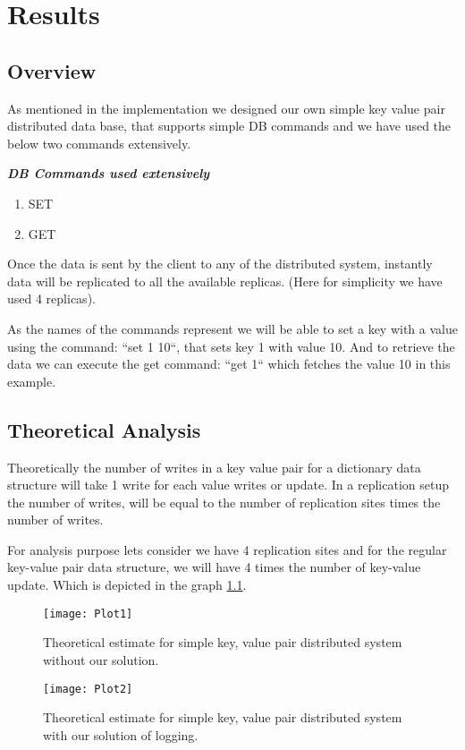 \chapter{Results}

\section{Overview}
As mentioned in the implementation we designed our own simple key value pair distributed data base, that supports simple DB commands and we have used the below two commands extensively. 

\textbf{\textit{DB Commands used extensively}}
\begin{enumerate}
\item SET 
\item GET
\end{enumerate}

 Once the data is sent by the client to any of the distributed system, instantly data will be replicated to all the available replicas. (Here for simplicity we have used 4 replicas). 

As the names of the commands represent we will be able to set a key with a value using the command: ``set 1 10``, that sets key 1 with value 10. And to retrieve the data we can execute the get command: ``get 1`` which fetches the value 10 in this example.

\section{Theoretical Analysis}
Theoretically the number of writes in a key value pair for a dictionary data structure will take 1 write for each value writes or update. In a replication setup the number of writes, will be equal to the number of replication sites times the number of writes. 

For analysis purpose lets consider we have 4 replication sites and for the regular key-value pair data structure, we will have 4 times the number of key-value update. Which is depicted in the graph \ref{fig:8}.

\begin{figure}[!htbp]
    \centering
    \texttt{[image: Plot1]}
    \caption{ Theoretical estimate for simple key, value pair distributed system without our solution.}
    \label{fig:8}
\end{figure}

\begin{figure}[!htbp]
    \centering
    \texttt{[image: Plot2]}
    \caption{Theoretical estimate for simple key, value pair distributed system with our solution of logging.}
    \label{fig:9}
\end{figure}

